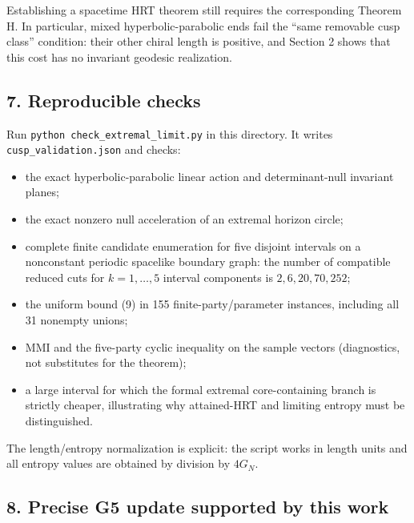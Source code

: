 \documentclass[11pt]{article}
\providecommand{\tightlist}{\setlength{\itemsep}{1pt}\setlength{\parskip}{0pt}}
\begin{document}
Establishing a spacetime HRT theorem still requires the corresponding
Theorem H. In particular, mixed hyperbolic-parabolic ends fail the
``same removable cusp class'' condition: their other chiral length is
positive, and Section 2 shows that this cost has no invariant geodesic
realization.

\subsection{7. Reproducible checks}\label{reproducible-checks}

Run \texttt{python\ check\_\allowbreak extremal\_\allowbreak limit.py} in this directory. It
writes \texttt{cusp\_\allowbreak validation.json} and checks:

\begin{itemize}
\tightlist
\item
  the exact hyperbolic-parabolic linear action and determinant-null
  invariant planes;
\item
  the exact nonzero null acceleration of an extremal horizon circle;
\item
  complete finite candidate enumeration for five disjoint intervals on a
  nonconstant periodic spacelike boundary graph: the number of
  compatible reduced cuts for \(k=1,\ldots,5\) interval components is
  \(2,6,20,70,252\);
\item
  the uniform bound (9) in 155 finite-party/parameter instances,
  including all 31 nonempty unions;
\item
  MMI and the five-party cyclic inequality on the sample vectors
  (diagnostics, not substitutes for the theorem);
\item
  a large interval for which the formal extremal core-containing branch
  is strictly cheaper, illustrating why attained-HRT and limiting
  entropy must be distinguished.
\end{itemize}

The length/entropy normalization is explicit: the script works in length
units and all entropy values are obtained by division by \(4G_N\).

\subsection{8. Precise G5 update supported by this
work}\label{precise-g5-update-supported-by-this-work}
\end{document}
